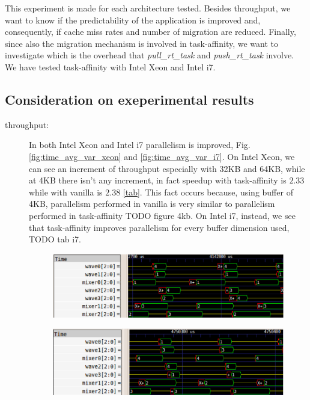 This experiment is made for each architecture tested. Besides throughput, we want to know if the predictability of the application is improved and, 
consequently, if cache miss rates and number of migration are reduced. Finally, since also the migration mechanism is involved in task-affinity, we want 
to investigate which is the overhead that \textit{pull\_rt\_task} and \textit{push\_rt\_task} involve. We have tested task-affinity with Intel Xeon and 
Intel i7.

\subsection{Consideration on exeperimental results}

\begin{description}

\item[throughput:] In both Intel Xeon and Intel i7 parallelism is improved, Fig. \ref{fig:time_avg_var_xeon} and \ref{fig:time_avg_var_i7}. On Intel Xeon, 
we can see an increment of throughput especially with 32KB and 64KB, while at 4KB there isn't any increment, in fact speedup with task-affinity is $2.33$ 
while with vanilla is $2.38$ \ref{tab}. This fact occurs because, using buffer of 4KB, parallelism performed in vanilla is very similar to 
parallelism performed in task-affinity TODO figure 4kb. On Intel i7, instead, we see that task-affinity improves parallelism for every buffer dimension 
used, TODO tab i7.

\begin{figure}[htbp]
\centering
\includegraphics[width=\widefigure]{images/results_xeon/4KB_results_xeon_taskaff.eps}
\caption{}
\label{fig:4KB_xeon_results_taskaff}
\end{figure}

\begin{figure}[htbp]
\centering
\includegraphics[width=\widefigure]{images/results_xeon/4KB_results_xeon_van.eps}
\caption{}
\label{fig:4KB_xeon_results_van}
\end{figure}


\end{description}
